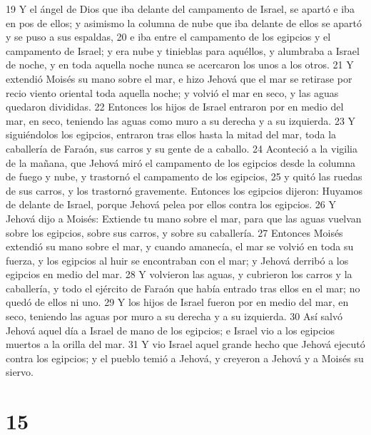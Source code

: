 19 Y el ángel de Dios que iba delante del campamento de Israel, se apartó e iba en pos de ellos; y asimismo la columna de nube que iba delante de ellos se apartó y se puso a sus espaldas,
20 e iba entre el campamento de los egipcios y el campamento de Israel; y era nube y tinieblas para aquéllos, y alumbraba a Israel de noche, y en toda aquella noche nunca se acercaron los unos a los otros.
21 Y extendió Moisés su mano sobre el mar, e hizo Jehová que el mar se retirase por recio viento oriental toda aquella noche; y volvió el mar en seco, y las aguas quedaron divididas.
22 Entonces los hijos de Israel entraron por en medio del mar, en seco, teniendo las aguas como muro a su derecha y a su izquierda.
23 Y siguiéndolos los egipcios, entraron tras ellos hasta la mitad del mar, toda la caballería de Faraón, sus carros y su gente de a caballo.
24 Aconteció a la vigilia de la mañana, que Jehová miró el campamento de los egipcios desde la columna de fuego y nube, y trastornó el campamento de los egipcios,
25 y quitó las ruedas de sus carros, y los trastornó gravemente. Entonces los egipcios dijeron: Huyamos de delante de Israel, porque Jehová pelea por ellos contra los egipcios.
26 Y Jehová dijo a Moisés: Extiende tu mano sobre el mar, para que las aguas vuelvan sobre los egipcios, sobre sus carros, y sobre su caballería.
27 Entonces Moisés extendió su mano sobre el mar, y cuando amanecía, el mar se volvió en toda su fuerza, y los egipcios al huir se encontraban con el mar; y Jehová derribó a los egipcios en medio del mar.
28 Y volvieron las aguas, y cubrieron los carros y la caballería, y todo el ejército de Faraón que había entrado tras ellos en el mar; no quedó de ellos ni uno.
29 Y los hijos de Israel fueron por en medio del mar, en seco, teniendo las aguas por muro a su derecha y a su izquierda.
30 Así salvó Jehová aquel día a Israel de mano de los egipcios; e Israel vio a los egipcios muertos a la orilla del mar.
31 Y vio Israel aquel grande hecho que Jehová ejecutó contra los egipcios; y el pueblo temió a Jehová, y creyeron a Jehová y a Moisés su siervo.

\chapter{15}

